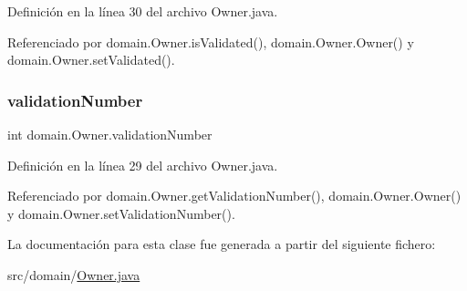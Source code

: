 Definición en la línea 30 del archivo Owner.\+java.



Referenciado por domain.\+Owner.\+is\+Validated(), domain.\+Owner.\+Owner() y domain.\+Owner.\+set\+Validated().

\mbox{\label{classdomain_1_1_owner_a9d429221bf395775b4dceafc96a4658b}} 
\subsubsection{\texorpdfstring{validationNumber}{validationNumber}}
{\footnotesize\ttfamily int domain.\+Owner.\+validation\+Number\hspace{0.3cm}{\ttfamily [private]}}



Definición en la línea 29 del archivo Owner.\+java.



Referenciado por domain.\+Owner.\+get\+Validation\+Number(), domain.\+Owner.\+Owner() y domain.\+Owner.\+set\+Validation\+Number().



La documentación para esta clase fue generada a partir del siguiente fichero\+:\begin{DoxyCompactItemize}
\item 
src/domain/\mbox{\hyperlink{_owner_8java}{Owner.\+java}}\end{DoxyCompactItemize}
